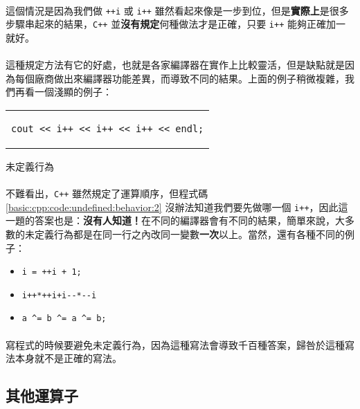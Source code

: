 \documentclass[12pt,a4paper,oneside]{article}
\begin{document}
\begin{CJK}{UTF8}{bkai}
\paragraph{}這個情況是因為我們做 \lstinline!++i! 或 \lstinline!i++! 雖然看起來像是一步到位，但是\textbf{實際上}是很多步驟串起來的結果，\texttt{C++} 並\textbf{沒有規定}何種做法才是正確，只要 \lstinline!i++! 能夠正確加一就好。
\paragraph{}這種規定方法有它的好處，也就是各家編譯器在實作上比較靈活，但是缺點就是因為每個廠商做出來編譯器功能差異，而導致不同的結果。上面的例子稍微複雜，我們再看一個淺顯的例子：

\begin{code}[h!]
\centering
\begin{tabular}{c}
\begin{lstlisting}
cout << i++ << i++ << i++ << endl;
\end{lstlisting}
\end{tabular}
\caption{未定義行為}
\label{basic:cpp:code:undefined:behavior:2}
\end{code}

\paragraph{}不難看出，\texttt{C++} 雖然規定了運算順序，但程式碼 \ref{basic:cpp:code:undefined:behavior:2} 沒辦法知道我們要先做哪一個 \lstinline!i++!，因此這一題的答案也是：\textbf{沒有人知道！}在不同的編譯器會有不同的結果，簡單來說，大多數的未定義行為都是在同一行之內改同一變數\textbf{一次}以上。當然，還有各種不同的例子：

\begin{itemize}
\item \lstinline!i = ++i + 1;!
\item \lstinline!i++*++i+i--*--i!
\item \lstinline!a ^= b ^= a ^= b;!
\end{itemize}

\paragraph{}寫程式的時候要避免未定義行為，因為這種寫法會導致千百種答案，歸咎於這種寫法本身就不是正確的寫法。

\subsection{其他運算子}


\end{CJK}
\end{document}

